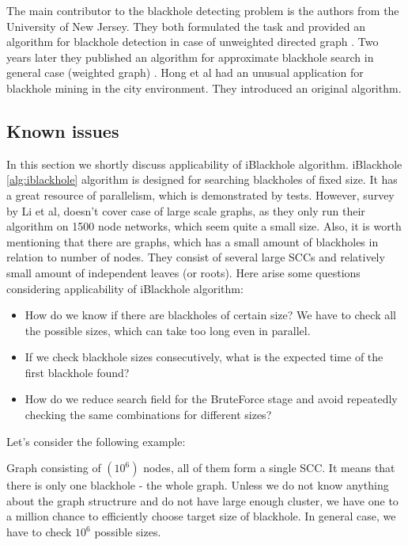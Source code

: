 \documentclass{svproc}
\begin{document}
The main contributor to the blackhole detecting problem is the authors from the University of New Jersey. They both formulated the task and provided an algorithm for blackhole detection in case of unweighted directed graph \cite{li2010detecting}. 
Two years later they published an algorithm for approximate blackhole search in general case (weighted graph) \cite{li2012mining,li2014mining}. 
Hong et al \cite{hong2015detecting} had
an unusual application for blackhole mining in the city environment. They introduced an original algorithm.  

\subsection{Known issues}
In this section we shortly discuss applicability of iBlackhole algorithm.
iBlackhole \ref{alg:iblackhole} algorithm is designed for searching blackholes of fixed size. It has a great resource of parallelism, which is demonstrated
by tests. However, survey by Li et al, doesn't cover case of large scale graphs, as they only run their algorithm on 1500 node networks, which seem quite
a small size.
Also, it is worth mentioning that there are graphs, which has a small amount of blackholes in relation to number of nodes. They consist
of several large SCCs and relatively small amount of independent leaves (or roots). Here arise some questions considering applicability of
iBlackhole algorithm:
\begin{itemize}
\item How do we know if there are blackholes of certain size? We have to check all the possible sizes, which can take too long even in parallel.
\item If we check blackhole sizes consecutively, what is the expected time of the first blackhole found?
\item How do we reduce search field for the BruteForce stage and avoid repeatedly checking the same combinations for different sizes?
\end{itemize}

Let's consider the following example:

Graph consisting of $(10^6)$ nodes, all of them form a single SCC. It means that there is only one blackhole - the whole graph.
Unless we do not know anything about the graph structrure and do not have large enough cluster, we have one to a million chance
to efficiently choose target size of blackhole. In general case, we have to check $10^6$ possible sizes.
\end{document}
